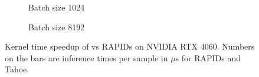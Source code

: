 \begin{figure}[ht]
  \centering
  \begin{subfigure}[b]{.45\textwidth}
    \caption{Batch size 1024}
  \end{subfigure}
  \begin{subfigure}[b]{.45\textwidth}
    \caption{Batch size 8192}
  \end{subfigure}
  \hfill
  \caption{\label{Fig:KernelTimeIndividualBenchmarks4060}Kernel time speedup of \Treebeard{} vs RAPIDs on NVIDIA RTX 4060. Numbers on the bars are 
  inference times per sample in $\mu$s for RAPIDs and Tahoe.}
\end{figure}

